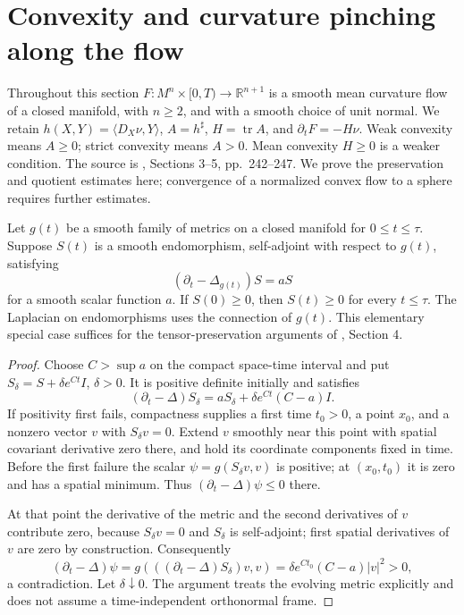 \chapter{Convexity and curvature pinching along the flow}\label{sec:mcf-pinching}
Throughout this section $F:M^n\times[0,T)\to\mathbb R^{n+1}$ is a smooth mean curvature flow of a closed manifold, with $n\geq2$, and with a smooth choice of unit normal. We retain $h(X,Y)=\langle D_X\nu,Y\rangle$, $A=h^\sharp$, $H=\operatorname{tr}A$, and $\partial_tF=-H\nu$. Weak convexity means $A\geq0$; strict convexity means $A>0$. Mean convexity $H\geq0$ is a weaker condition. The source is \cite{Hui84}, Sections 3--5, pp.~242--247. We prove the preservation and quotient estimates here; convergence of a normalized convex flow to a sphere requires further estimates.

\begin{lemma}\label{lem:evolving-metric-positive-tensor}
Let $g(t)$ be a smooth family of metrics on a closed manifold for $0\leq t\leq\tau$. Suppose $S(t)$ is a smooth endomorphism, self-adjoint with respect to $g(t)$, satisfying
\[
 (\partial_t-\Delta_{g(t)})S=aS
\]
for a smooth scalar function $a$. If $S(0)\geq0$, then $S(t)\geq0$ for every $t\leq\tau$. The Laplacian on endomorphisms uses the connection of $g(t)$. This elementary special case suffices for the tensor-preservation arguments of \cite{Hui84}, Section 4.
\end{lemma}
\begin{proof}
Choose $C>\sup a$ on the compact space-time interval and put $S_\delta=S+\delta e^{Ct}I$, $\delta>0$. It is positive definite initially and satisfies
\[
 (\partial_t-\Delta)S_\delta=aS_\delta+\delta e^{Ct}(C-a)I.
\]
If positivity first fails, compactness supplies a first time $t_0>0$, a point $x_0$, and a nonzero vector $v$ with $S_\delta v=0$. Extend $v$ smoothly near this point with spatial covariant derivative zero there, and hold its coordinate components fixed in time. Before the first failure the scalar $\psi=g(S_\delta v,v)$ is positive; at $(x_0,t_0)$ it is zero and has a spatial minimum. Thus $(\partial_t-\Delta)\psi\leq0$ there.

At that point the derivative of the metric and the second derivatives of $v$ contribute zero, because $S_\delta v=0$ and $S_\delta$ is self-adjoint; first spatial derivatives of $v$ are zero by construction. Consequently
\[
 (\partial_t-\Delta)\psi
 =g(((\partial_t-\Delta)S_\delta)v,v)
 =\delta e^{Ct_0}(C-a)|v|^2>0,
\]
a contradiction. Let $\delta\downarrow0$. The argument treats the evolving metric explicitly and does not assume a time-independent orthonormal frame.
\end{proof}

